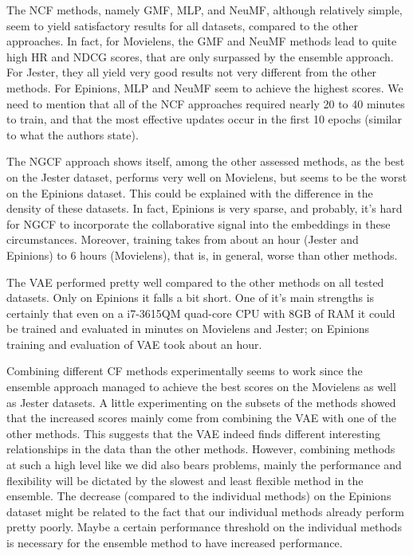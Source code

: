 
The NCF methods, namely GMF, MLP, and NeuMF, although relatively simple, seem to yield satisfactory results for all datasets, compared to the other approaches. 
In fact, for Movielens, the GMF and NeuMF methods lead to quite high HR and NDCG scores, that are only surpassed by the ensemble approach.
For Jester, they all yield very good results not very different from the other methods.
For Epinions, MLP and NeuMF seem to achieve the highest scores.
We need to mention that all of the NCF approaches required nearly 20 to 40 minutes to train, and that the most effective updates occur in the first 10 epochs (similar to what the authors state).


The NGCF approach shows itself, among the other assessed methods, as the best on the Jester dataset, performs very well on Movielens, but seems to be the worst on the Epinions dataset.
This could be explained with the difference in the density of these datasets.
In fact, Epinions is very sparse, and probably, it's hard for NGCF to incorporate the collaborative signal into the embeddings in these circumstances.
Moreover, training takes from about an hour (Jester and Epinions) to 6 hours (Movielens), that is, in general, worse than other methods.

The VAE performed pretty well compared to the other methods on all tested datasets. 
Only on Epinions it falls a bit short. 
One of it's main strengths is certainly that even on a i7-3615QM quad-core CPU with 8GB of RAM it could be trained and evaluated in minutes on Movielens and Jester; on Epinions training and evaluation of VAE took about an hour.

Combining different CF methods experimentally seems to work since the ensemble approach managed to achieve the best scores on the Movielens as well as Jester datasets. 
A little experimenting on the subsets of the methods showed that the increased scores mainly  come from combining the VAE with one of the other methods. 
This suggests that the VAE indeed finds different interesting relationships in the data than the other methods. 
However, combining methods at such a high level like we did also bears problems, mainly the performance and flexibility will be dictated by the slowest and least flexible method in the ensemble. 
The decrease (compared to the individual methods) on the Epinions dataset might be related to the fact that our individual methods already perform pretty poorly. 
Maybe a certain performance threshold on the individual methods is necessary for the ensemble method to have increased performance.

